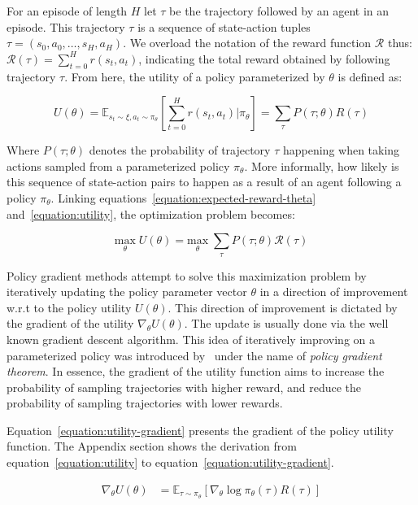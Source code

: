 \documentclass{../main.tex}{}
\begin{document}
For an episode of length $H$ let $\tau$ be the trajectory followed by an agent in an episode. This trajectory $\tau$ is a sequence of state-action tuples $\tau = (s_0, a_0, \dots, s_H, a_H)$. We overload the notation of the reward function $\mathcal{R}$ thus: $\mathcal{R}(\tau) = \sum_{t=0}^{H}r(s_t, a_t)$, indicating the total reward obtained by following trajectory $\tau$. From here, the utility of a policy parameterized by $\theta$ is defined as:

\begin{equation}\label{equation:utility}
U(\theta) = \mathbb{E}_{s_t \sim \xi, a_t \sim \pi_{\theta}}[\sum_{t=0}^{H}r(s_t, a_t) | \pi_{\theta}] = \sum_{\tau}P(\tau ; \theta){R}(\tau)
\end{equation}

Where $P(\tau ; \theta)$ denotes the probability of trajectory $\tau$ happening when taking actions sampled from a parameterized policy $\pi_{\theta}$. More informally, how likely is this sequence of state-action pairs to happen as a result of an agent following a policy $\pi_{\theta}$. Linking equations~\ref{equation:expected-reward-theta} and~\ref{equation:utility}, the optimization problem becomes:

\begin{equation}\label{equation:utility-optimization}
\underset{\theta}{\text{max}}\; U(\theta) = \underset{\theta}{\text{max}}\; \sum_{\tau}P(\tau ; \theta)\mathcal{R}(\tau)
\end{equation}

Policy gradient methods attempt to solve this maximization problem by iteratively updating the policy parameter vector $\theta$ in a direction of improvement w.r.t to the policy utility $U(\theta)$. This direction of improvement is dictated by the gradient of the utility $\nabla_{\theta}U(\theta)$. The update is usually done via the well known gradient descent algorithm. This idea of iteratively improving on a parameterized policy was introduced by~\cite{Williams1992} under the name of \textit{policy gradient theorem}. In essence, the gradient of the utility function aims to increase the probability of sampling trajectories with higher reward, and reduce the probability of sampling trajectories with lower rewards.

Equation~\ref{equation:utility-gradient} presents the gradient of the policy utility function. The Appendix section shows the derivation from equation~\ref{equation:utility} to equation~\ref{equation:utility-gradient}.

\begin{equation}\label{equation:utility-gradient}
\begin{aligned}
\nabla_{\theta} U(\theta) & = \mathbb{E}_{\tau \sim \pi_{\theta}} [\nabla_{\theta} \log \pi_{\theta}(\tau) R(\tau)] \\
\end{aligned}
\end{equation}
\end{document}
